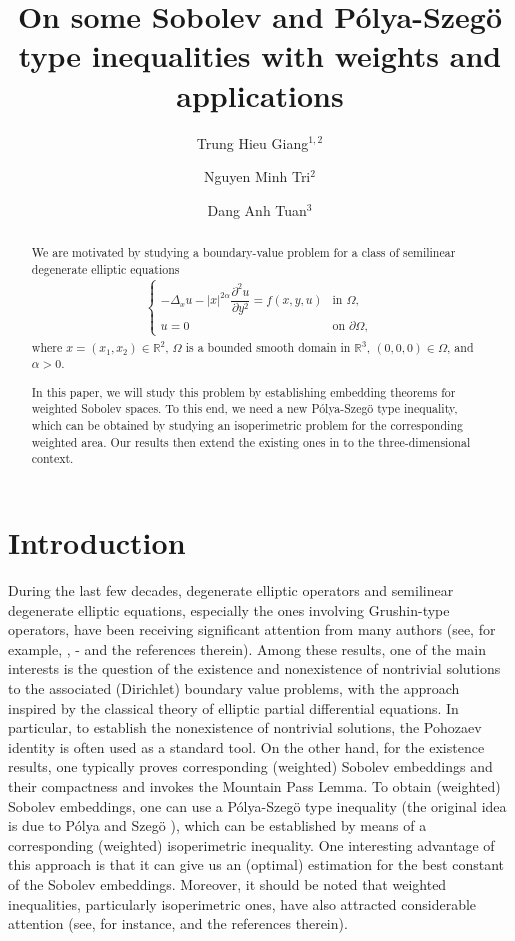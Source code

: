 \documentclass[10pt, reqno]{amsart}
\title[Weighted inequalities]{On some Sobolev and P\'olya-Szeg\"o type inequalities with weights and applications}
\author[T.H.Giang]{Trung Hieu Giang$^{1,2}$}
\author[N.M.Tri]{Nguyen Minh Tri$^{2}$}
\author[D.A.Tuan]{Dang Anh Tuan$^{3}$}
\begin{document}
	
	
	\begin{abstract}
		We are motivated by studying a boundary-value problem for a class of semilinear degenerate elliptic equations
		\begin{align}\tag{P}\label{P}
			\begin{cases}
				- \Delta_x u - |x|^{2\alpha} \dfrac{\partial^2 u}{\partial y^2} = f(x,y,u) & \textrm{in } \Omega, \\
				u = 0 & \textrm{on } \partial \Omega,
			\end{cases}
		\end{align}
		where $x = (x_1, x_2) \in \mathbb{R}^2$, $\Omega$ is a bounded smooth domain in $\mathbb{R}^3$, $(0,0,0) \in \Omega $, and $\alpha > 0$.
		
		In this paper, we will study this problem by establishing embedding theorems for weighted Sobolev spaces. To this end, we need a new P\'olya-Szeg\"o type inequality, which can be obtained by studying an isoperimetric problem for the corresponding weighted area. Our results then extend the existing ones in \cite{nga, Luyen2} to the three-dimensional context.
	\end{abstract}
	
	\maketitle
	\section{Introduction}\label{sec1}
	
	During the last few decades, degenerate elliptic operators and semilinear degenerate elliptic equations, especially the ones involving Grushin-type operators, have been receiving significant attention from many authors (see, for example, \cite{Luyen, Luyen2, beck, cap, chen, dou}, \cite{Ma}-\cite{Tri3} and the references therein). Among these results, one of the main interests is the question of the existence and nonexistence of nontrivial solutions to the associated (Dirichlet) boundary value problems, with the approach inspired by the classical theory of elliptic partial differential equations. In particular, to establish the nonexistence of nontrivial solutions, the Pohozaev identity is often used as a standard tool. On the other hand, for the existence results, one typically proves corresponding (weighted) Sobolev embeddings and their compactness and invokes the Mountain Pass Lemma. To obtain (weighted) Sobolev embeddings, one can use a P\'olya-Szeg\"o type inequality (the original idea is due to P\'olya and Szeg\"o \cite{PoSz}), which can be established by means of a corresponding (weighted) isoperimetric inequality. One interesting advantage of this approach is that it can give us an (optimal) estimation for the best constant of the Sobolev embeddings. Moreover, it should be noted that weighted inequalities, particularly isoperimetric ones, have also attracted considerable attention (see, for instance, \cite{alvino, aubin, brock, brock2, cab, mon, PoSz} and the references therein).
	
\end{document}
